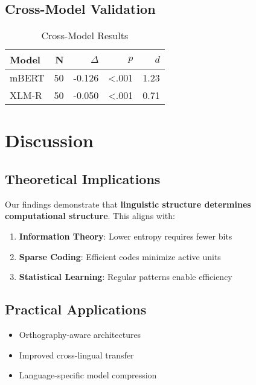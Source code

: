 \documentclass[11pt,a4paper]{article}
\begin{document}
\subsection{Cross-Model Validation}

\begin{table}[h]
\centering
\caption{Cross-Model Results}
\label{tab:crossmodel}
\begin{tabular}{lrrrr}
\toprule
\textbf{Model} & \textbf{N} & \textbf{$\Delta$} & \textbf{$p$} & \textbf{$d$} \\
\midrule
mBERT & 50 & -0.126 & <.001 & 1.23 \\
XLM-R & 50 & -0.050 & <.001 & 0.71 \\
\bottomrule
\end{tabular}
\end{table}

\section{Discussion}

\subsection{Theoretical Implications}

Our findings demonstrate that \textbf{linguistic structure determines computational structure}. This aligns with:
\begin{enumerate}
    \item \textbf{Information Theory}: Lower entropy requires fewer bits \cite{shannon1948}
    \item \textbf{Sparse Coding}: Efficient codes minimize active units \cite{olshausen1996}
    \item \textbf{Statistical Learning}: Regular patterns enable efficiency \cite{frost2012}
\end{enumerate}

\subsection{Practical Applications}

\begin{itemize}
    \item Orthography-aware architectures
    \item Improved cross-lingual transfer
    \item Language-specific model compression
\end{itemize}
\end{document}
